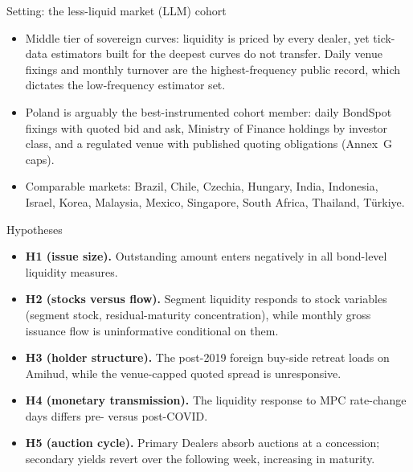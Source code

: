 \documentclass[aspectratio=169,11pt]{beamer}
\begin{document}
\begin{frame}{Setting: the less-liquid market (LLM) cohort}
  \begin{itemize}
    \item Middle tier of sovereign curves: liquidity is priced by every dealer,
          yet tick-data estimators built for the deepest curves do not transfer.
          Daily venue fixings and monthly turnover are the highest-frequency
          public record, which dictates the low-frequency estimator set.
    \item Poland is arguably the best-instrumented cohort member: daily
          BondSpot fixings with quoted bid and ask, Ministry of Finance
          holdings by investor class, and a regulated venue with published
          quoting obligations (Annex~G caps).
    \item Comparable markets: Brazil, Chile, Czechia, Hungary, India,
          Indonesia, Israel, Korea, Malaysia, Mexico, Singapore, South Africa,
          Thailand, T\"urkiye.
  \end{itemize}
\end{frame}

\begin{frame}{Hypotheses}
  \small
  \begin{itemize}
    \item \textbf{H1 (issue size).} Outstanding amount enters negatively in all
          bond-level liquidity measures.
    \item \textbf{H2 (stocks versus flow).} Segment liquidity responds to
          stock variables (segment stock, residual-maturity concentration),
          while monthly gross issuance flow is uninformative conditional on
          them.
    \item \textbf{H3 (holder structure).} The post-2019 foreign buy-side
          retreat loads on Amihud, while the venue-capped quoted spread is
          unresponsive.
    \item \textbf{H4 (monetary transmission).} The liquidity response to MPC
          rate-change days differs pre- versus post-COVID.
    \item \textbf{H5 (auction cycle).} Primary Dealers absorb auctions at a
          concession; secondary yields revert over the following week,
          increasing in maturity.
  \end{itemize}
\end{frame}
\end{document}
